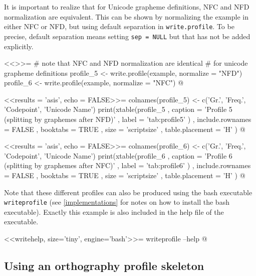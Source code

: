 \noindent It is important to realize that for Unicode grapheme definitions, NFC 
and NFD normalization are equivalent. This can be shown by normalizing the 
example in either NFC or NFD, but using default separation in 
\texttt{write.profile}. To be precise, default separation means setting \texttt{sep = NULL} 
but that has not be added explicitly.

<<>>=
# note that NFC and NFD normalization are identical
# for unicode grapheme definitions
profile_5 <- write.profile(example, normalize = "NFD")
profile_6 <- write.profile(example, normalize = "NFC")
@

<<results = 'asis', echo = FALSE>>=
colnames(profile_5) <- c('Gr.', 'Freq.', 'Codepoint', 'Unicode Name')
print(xtable(profile_5
        , caption = 'Profile 5 (splitting by graphemes after NFD)'
        , label = 'tab:profile5'
        )
  , include.rownames = FALSE
  , booktabs = TRUE
  , size = 'scriptsize'
  , table.placement = 'H'
  )
@

<<results = 'asis', echo = FALSE>>=
colnames(profile_6) <- c('Gr.', 'Freq.', 'Codepoint', 'Unicode Name')
print(xtable(profile_6
        , caption = 'Profile 6 (splitting by graphemes after NFC)'
        , label = 'tab:profile6'
        )
  , include.rownames = FALSE
  , booktabs = TRUE
  , size = 'scriptsize'
  , table.placement = 'H'
  )
@

\noindent Note that these different profiles can also be produced using the bash 
executable \texttt{writeprofile} (see \ref{implementations} for notes on how to 
install the bash executable). Exactly this example is also included in the help 
file of the executable.

<<writehelp, size='tiny', engine='bash'>>=
writeprofile --help
@

\subsection*{Using an orthography profile skeleton}


